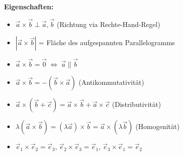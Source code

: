 \textbf{Eigenschaften:}
\begin{itemize}
     \item $\vec a \times \vec b \perp \vec a, \vec b$ (Richtung via Rechte-Hand-Regel)
     \item $|\vec a \times \vec b|$ = Fläche des aufgespannten Parallelogramms
     \item $\vec a \times \vec b = \vec 0 \;\Leftrightarrow\; \vec a \parallel \vec b$
     \item $\vec a \times \vec b = -(\vec b \times \vec a)$ (Antikommutativität)
     \item $\vec a \times (\vec b + \vec c) = \vec a \times \vec b + \vec a \times \vec c$ (Distributivität)
     \item $\lambda(\vec a \times \vec b) = (\lambda\vec a) \times \vec b = \vec a \times (\lambda\vec b)$ (Homogenität)
     \item $\vec e_1 \times \vec e_2 = \vec e_3$, \quad $\vec e_2 \times \vec e_3 = \vec e_1$, \quad $\vec e_3 \times \vec e_1 = \vec e_2$
\end{itemize}